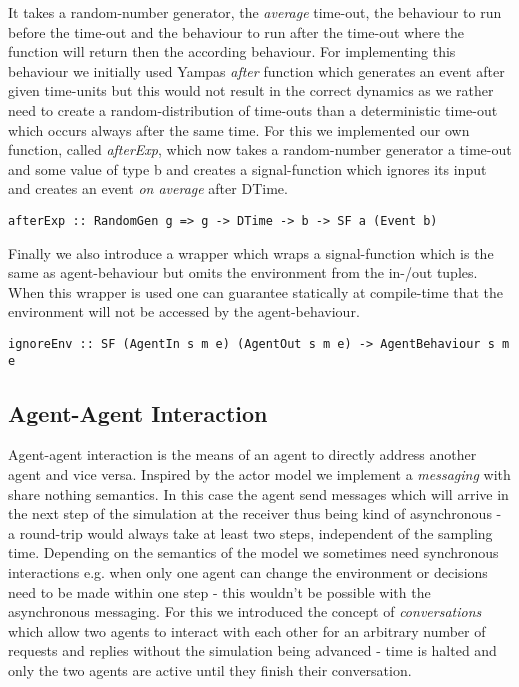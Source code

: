It takes a random-number generator, the \textit{average} time-out, the behaviour to run before the time-out and the behaviour to run after the time-out where the function will return then the according behaviour. For implementing this behaviour we initially used Yampas \textit{after} function which generates an event after given time-units but this would not result in the correct dynamics as we rather need to create a random-distribution of time-outs than a deterministic time-out which occurs always after the same time. For this we implemented our own function, called \textit{afterExp}, which now takes a random-number generator a time-out and some value of type b and creates a signal-function which ignores its input and creates an event \textit{on average} after DTime.

\begin{verbatim}
afterExp :: RandomGen g => g -> DTime -> b -> SF a (Event b)
\end{verbatim}

Finally we also introduce a wrapper which wraps a signal-function which is the same as agent-behaviour but omits the environment from the in-/out tuples. When this wrapper is used one can guarantee statically at compile-time that the environment will not be accessed by the agent-behaviour.

\begin{verbatim}
ignoreEnv :: SF (AgentIn s m e) (AgentOut s m e) -> AgentBehaviour s m e 
\end{verbatim}

\subsection{Agent-Agent Interaction}
Agent-agent interaction is the means of an agent to directly address another agent and vice versa. Inspired by the actor model we implement a  \textit{messaging} with share nothing semantics. In this case the agent send messages which will arrive in the next step of the simulation at the receiver thus being kind of asynchronous - a round-trip would always take at least two steps, independent of the sampling time. Depending on the semantics of the model we sometimes need synchronous interactions e.g. when only one agent can change the environment or decisions need to be made within one step - this wouldn't be possible with the asynchronous messaging. For this we introduced the concept of \textit{conversations} which allow two agents to interact with each other for an arbitrary number of requests and replies without the simulation being advanced - time is halted and only the two agents are active until they finish their conversation.


